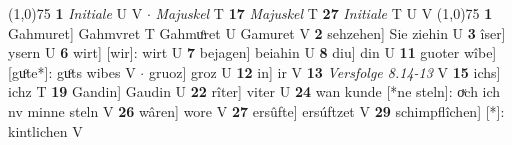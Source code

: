 \documentclass[8pt,a4paper,notitlepage]{article}
\begin{document}
\begin{table}[ht]
\begin{minipage}[t]{0.5\linewidth}
\line(1,0){75} \newline
\textbf{1} \textit{Initiale} U V   $\cdot$ \textit{Majuskel} T  \textbf{17} \textit{Majuskel} T  \textbf{27} \textit{Initiale} T U V  \newline
\line(1,0){75} \newline
\textbf{1} Gahmuret] Gahmvret T Gahmuͦret U Gamuret V \textbf{2} sehzehen] Sie ziehin U \textbf{3} îser] ysern U \textbf{6} wirt] [wir]: wirt U \textbf{7} bejagen] beiahin U \textbf{8} diu] din U \textbf{11} guoter wîbe] [guͦte*]: guͦts wibes V  $\cdot$ gruoz] groz U \textbf{12} in] ir V \textbf{13} \textit{Versfolge 8.14-13} V  \textbf{15} ichs] ichz T \textbf{19} Gandin] Gaudin U \textbf{22} rîter] viter U \textbf{24} wan kunde [*ne steln]: oͮch ich nv minne steln V \textbf{26} wâren] wore V \textbf{27} ersûfte] ersúftzet V \textbf{29} schimpflîchen] [*]: kintlichen V \newline
\end{minipage}
\end{table}
\end{document}
